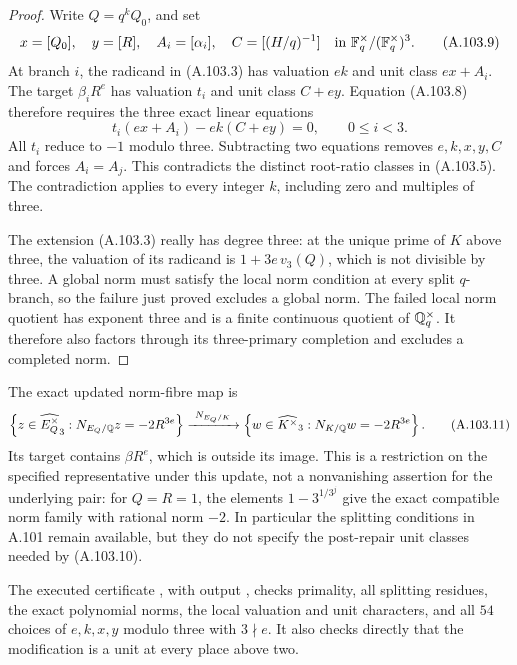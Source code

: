 \begin{proof}
Write $Q=q^kQ_0$, and set
\[
 x=[Q_0],\quad y=[R],\quad A_i=[\alpha_i],
       \quad C=[(H/q)^{-1}]
             \quad\hbox{in }\mathbb F_q^\times/(\mathbb F_q^\times)^3.
 \tag{A.103.9}
\]
At branch $i$, the radicand in (A.103.3) has valuation
$ek$ and unit class $ex+A_i$.
The target $\beta_iR^e$ has valuation $t_i$ and
unit class $C+ey$.
Equation (A.103.8) therefore requires the three exact
linear equations
\[
             t_i(ex+A_i)-ek(C+ey)=0,
                           \qquad 0\le i<3.
 \tag{A.103.10}
\]
All $t_i$ reduce to $-1$ modulo three.
Subtracting two equations removes $e,k,x,y,C$ and
forces $A_i=A_j$.
This contradicts the distinct root-ratio classes in
(A.103.5).
The contradiction applies to every integer $k$,
including zero and multiples of three.

The extension (A.103.3) really has degree three:
at the unique prime of $K$ above three, the valuation
of its radicand is $1+3e\,v_3(Q)$, which is not
divisible by three.
A global norm must satisfy the local norm condition
at every split $q$-branch, so the failure just proved
excludes a global norm.
The failed local norm quotient has exponent three
and is a finite continuous quotient of $\mathbb Q_q^\times$.
It therefore also factors through its three-primary
completion and excludes a completed norm.
\end{proof}

The exact updated norm-fibre map is
\[
 \left\{z\in\widehat{E_Q^\times}_3:
       N_{E_Q/\mathbb Q}z=-2R^{3e}\right\}
       \xrightarrow{\ N_{E_Q/K}\ }
 \left\{w\in\widehat{K^\times}_3:
       N_{K/\mathbb Q}w=-2R^{3e}\right\}.
 \tag{A.103.11}
\]
Its target contains $\beta R^e$, which is outside
its image.
This is a restriction on the specified representative
under this update, not a nonvanishing assertion for
the underlying pair: for $Q=R=1$, the elements
$1-3^{1/3^j}$ give the exact compatible norm family
with rational norm $-2$.
In particular the splitting conditions in A.101 remain
available, but they do not specify the post-repair
unit classes needed by (A.103.10).

\noindent The executed certificate
, with output
, checks
primality, all splitting residues, the exact polynomial
norms, the local valuation and unit characters, and all
$54$ choices of $e,k,x,y$ modulo three with $3\nmid e$.
It also checks directly that the modification is a unit
at every place above two.
